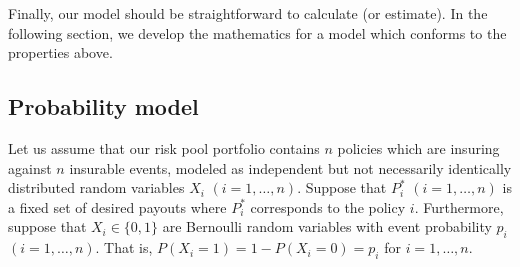 \documentclass[12pt]{article}
\begin{document}
Finally, our model should be straightforward to calculate (or estimate). In the following section, we develop the mathematics for a model which conforms to the properties above.

\subsection{Probability model}

Let us assume that our risk pool portfolio contains $n$ policies which are insuring against $n$ insurable events, modeled as independent but not necessarily identically distributed random variables $X_i$ $(i=1,\ldots,n)$. Suppose that $P^*_i$ $(i=1,\ldots,n)$ is a fixed set of desired payouts where $P^*_i$ corresponds to the policy $i$. Furthermore, suppose that $X_i\in\{0,1\}$ are Bernoulli random variables with event probability $p_i$ $(i=1,\ldots,n)$. That is, $P(X_i = 1) = 1 - P(X_i = 0) = p_i$ for $i = 1,\ldots,n$. 
\end{document}
